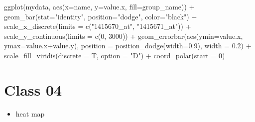 \documentclass[
]{book}
\newenvironment{Shaded}{\begin{snugshade}}{\end{snugshade}}
\newcommand{\AttributeTok}[1]{\textcolor[rgb]{0.77,0.63,0.00}{#1}}
\newcommand{\DecValTok}[1]{\textcolor[rgb]{0.00,0.00,0.81}{#1}}
\newcommand{\FloatTok}[1]{\textcolor[rgb]{0.00,0.00,0.81}{#1}}
\newcommand{\FunctionTok}[1]{\textcolor[rgb]{0.00,0.00,0.00}{#1}}
\newcommand{\NormalTok}[1]{#1}
\newcommand{\SpecialCharTok}[1]{\textcolor[rgb]{0.00,0.00,0.00}{#1}}
\newcommand{\StringTok}[1]{\textcolor[rgb]{0.31,0.60,0.02}{#1}}
\providecommand{\tightlist}{%
  \setlength{\itemsep}{0pt}\setlength{\parskip}{0pt}}
\begin{document}
\begin{Shaded}
\begin{Highlighting}[]

\FunctionTok{ggplot}\NormalTok{(mydata, }\FunctionTok{aes}\NormalTok{(}\AttributeTok{x=}\NormalTok{name, }\AttributeTok{y=}\NormalTok{value.x, }\AttributeTok{fill=}\NormalTok{group\_name)) }\SpecialCharTok{+}
  \FunctionTok{geom\_bar}\NormalTok{(}\AttributeTok{stat=}\StringTok{"identity"}\NormalTok{, }\AttributeTok{position=}\StringTok{"dodge"}\NormalTok{, }\AttributeTok{color=}\StringTok{"black"}\NormalTok{) }\SpecialCharTok{+}
  \FunctionTok{scale\_x\_discrete}\NormalTok{(}\AttributeTok{limits =} \FunctionTok{c}\NormalTok{(}\StringTok{"1415670\_at"}\NormalTok{, }\StringTok{"1415671\_at"}\NormalTok{)) }\SpecialCharTok{+}
  \FunctionTok{scale\_y\_continuous}\NormalTok{(}\AttributeTok{limits =} \FunctionTok{c}\NormalTok{(}\DecValTok{0}\NormalTok{, }\DecValTok{3000}\NormalTok{)) }\SpecialCharTok{+}
  \FunctionTok{geom\_errorbar}\NormalTok{(}\FunctionTok{aes}\NormalTok{(}\AttributeTok{ymin=}\NormalTok{value.x, }\AttributeTok{ymax=}\NormalTok{value.x}\SpecialCharTok{+}\NormalTok{value.y),}
                \AttributeTok{position =} \FunctionTok{position\_dodge}\NormalTok{(}\AttributeTok{width=}\FloatTok{0.9}\NormalTok{), }
                \AttributeTok{width =} \FloatTok{0.2}\NormalTok{) }\SpecialCharTok{+}
  \FunctionTok{scale\_fill\_viridis}\NormalTok{(}\AttributeTok{discrete =}\NormalTok{ T, }\AttributeTok{option =} \StringTok{"D"}\NormalTok{) }\SpecialCharTok{+}
  \FunctionTok{coord\_polar}\NormalTok{(}\AttributeTok{start =} \DecValTok{0}\NormalTok{)  }
\end{Highlighting}
\end{Shaded}

\hypertarget{class-04-1}{%
\section{Class 04}\label{class-04-1}}

\begin{itemize}
\tightlist
\item
  heat map
\end{itemize}
\end{document}
